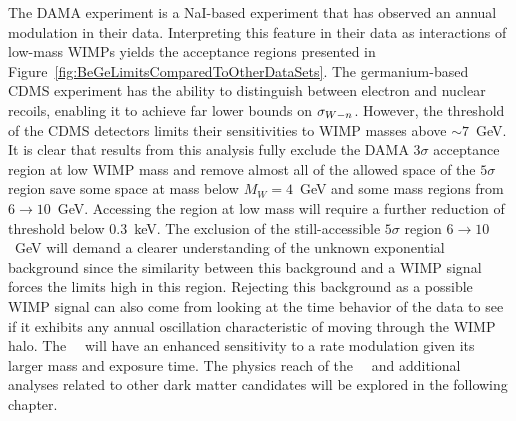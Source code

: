 The DAMA experiment is a NaI-based experiment that has observed an annual
modulation in their data.  Interpreting this feature in their data as
interactions of low-mass WIMPs yields the acceptance regions presented in
Figure~\ref{fig:BeGeLimitsComparedToOtherDataSets}.  The germanium-based CDMS
experiment has the ability to distinguish between electron and nuclear recoils,
enabling it to achieve far lower bounds on $\sigma_{W-n}$.  However, the threshold
of the CDMS detectors limits their sensitivities to WIMP masses above
$\sim7$~GeV.  It is clear that results from this analysis fully exclude the
DAMA $3\sigma$ acceptance region at low WIMP mass and remove almost all of the
allowed space of the $5\sigma$ region save some space at mass below
$M_{W}=4$~GeV and some mass regions from $6\to10$~GeV.  Accessing the region at
low mass will require a further reduction of threshold below 0.3~keV. 
The exclusion of the still-accessible $5\sigma$ region $6\to10$~GeV will demand
a clearer understanding of the unknown exponential background since the
similarity between this background and a WIMP signal forces the limits high in
this region.  Rejecting this background as a possible WIMP signal can also come
from looking at the time behavior of the data to see if it exhibits any annual
oscillation characteristic of moving through the WIMP halo.  The
\MJ~\minmod~will have an enhanced sensitivity to a rate modulation given its
larger mass and exposure time.  The physics reach of the \MJ~\minmod~and 
additional analyses related to other dark matter candidates will be 
explored in the following chapter.








